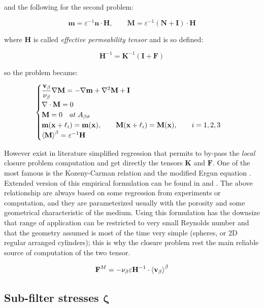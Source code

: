 and the following for the second problem:

$$
\mathbf{m} = \varepsilon^{-1} \mathbf{n} \cdot \mathbf{H}, \qquad \mathbf{M} = \varepsilon^{-1} \left(\mathbf{N} + \mathbf{I} \right)\cdot \mathbf{H}
$$

where $\mathbf{H}$ is called \textit{effective permeability tensor} and is so defined:

$$
\mathbf{H}^{-1} = \mathbf{K}^{-1} \left(\mathbf{I} +\mathbf{F}\right)
$$

so the problem became:

\begin{eqnarray}
	\begin{cases}
		\dfrac{\textbf{v}_{\beta}}{\nu_{\beta}} \nabla \mathbf{M} = -\nabla \mathbf{m} + \nabla^2 \mathbf{M} +\mathbf{I}\\
		\nabla \cdot \mathbf{M} = 0  \\
		\mathbf{M} = 0 \quad at \; A_{\beta \sigma} \\
		\mathbf{m}(\mathbf{x} +\ell_i) = \mathbf{m}(\mathbf{x}), \qquad \mathbf{M}(\mathbf{x} +\ell_i) = \mathbf{M}(\mathbf{x}), \qquad i=1,2,3 \\
		{\left< \mathbf{M} \right>}^{\beta} = \varepsilon^{-1} \mathbf{H}
	\end{cases}
\label{eq:M_problem}
\end{eqnarray}

However exist in literature simplified regression that permits to by-pass the \textit{local} closure problem computation and get directly the tensors $\mathbf{K}$ and $\mathbf{F}$.
One of the most famous is the Kozeny-Carman \citet{kozeny} relation and the modified Ergun equation \cite{transport2002bird}.
Extended version of this empirical formulation can be found in \citet{zampogna2016fluid} and \cite{yazdchi2012towards}.
The above relationship are always based on some regression from experiments or computation, and they are parameterized usually with the porosity and some geometrical characteristic of the medium.
Using this formulation has the downsize that range of application can be restricted to very small Reynolds number and that the geometry assumed is most of the time very simple (spheres, or 2D regular arranged cylinders); this is why the closure problem rest the main reliable source of computation of the two tensor.

$$\mathbf{F}^M = - \nu_{\beta} \varepsilon \mathbf{H}^{-1} \cdot {\left< \textbf{v}_{\beta}\right>}^{\beta}$$


\subsection{Sub-filter stresses $\boldsymbol{\zeta}$}

